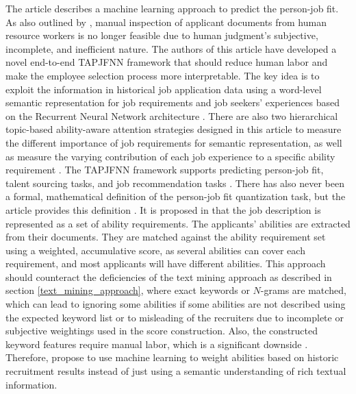 \documentclass[draft,final]{thesisclass} %
\begin{document}
The article \textcite{pj_fit_ml} describes a machine learning approach to predict the person-job fit.
As also outlined by \textcite[1]{pj_fit_ml}, manual inspection of applicant documents from human resource workers is no longer feasible due to human judgment's subjective, incomplete, and inefficient nature.
The authors of this article have developed a novel end-to-end \gls{TAPJFNN} framework that should reduce human labor and make the employee selection process more interpretable.
The key idea is to exploit the information in historical job application data using a word-level semantic representation for job requirements and job seekers' experiences based on the Recurrent Neural Network architecture \parencite[1]{pj_fit_ml}.
There are also two hierarchical topic-based ability-aware attention strategies designed in this article to measure the different importance of job requirements for semantic representation, as well as measure the varying contribution of each job experience to a specific ability requirement \parencite[1]{pj_fit_ml}.
The \gls{TAPJFNN} framework supports predicting person-job fit, talent sourcing tasks, and job recommendation tasks \parencite[1]{pj_fit_ml}.
There has also never been a formal, mathematical definition of the person-job fit quantization task, but the article \textcite{pj_fit_ml} provides this definition \parencite[2]{pj_fit_ml}.
It is proposed in \textcite[2]{pj_fit_ml} that the job description is represented as a set of ability requirements.
The applicants' abilities are extracted from their documents. They are matched against the ability requirement set using a weighted, accumulative score, as several abilities can cover each requirement, and most applicants will have different abilities.
This approach should counteract the deficiencies of the text mining approach as described in section \ref{text_mining_approach}, where exact keywords or $N$-grams are matched, which can lead to ignoring some abilities if some abilities are not described using the expected keyword list or to misleading of the recruiters due to incomplete or subjective weightings used in the score construction.
Also, the constructed keyword features require manual labor, which is a significant downside \parencite[5]{pj_fit_ml}.
Therefore, \textcite[2]{pj_fit_ml} propose to use machine learning to weight abilities based on historic recruitment results instead of just using a semantic understanding of rich textual information.
\end{document}

